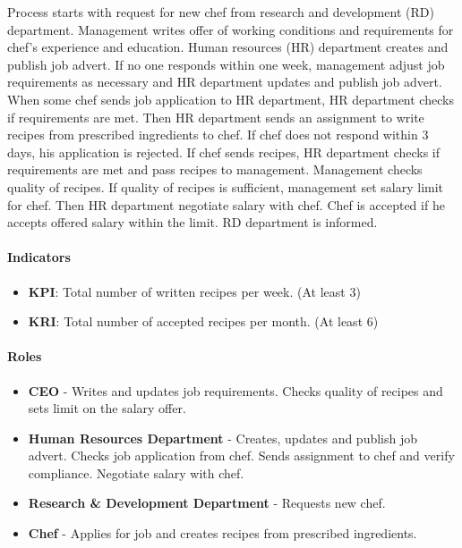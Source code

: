 \documentclass[11pt,a4paper]{article}
\begin{document}
Process starts with request for new chef from research and development (RD) department. Management writes offer of working conditions and requirements for chef's experience and education. Human resources (HR) department creates and publish job advert. If no one responds within one week, management adjust job requirements as necessary and HR department updates and publish job advert. When some chef sends job application to HR department, HR department checks if requirements are met. Then HR department sends an assignment to write recipes from prescribed ingredients to chef. If chef does not respond within 3 days, his application is rejected. If chef sends recipes, HR department checks if requirements are met and pass recipes to management. Management checks quality of recipes. If quality of recipes is sufficient, management set salary limit for chef. Then HR department negotiate salary with chef. Chef is accepted if he accepts offered salary within the limit. RD department is informed.

\paragraph{Indicators}

\begin{itemize}
    \item \textbf{KPI}: Total number of written recipes per week. (At least 3)
    \item \textbf{KRI}: Total number of accepted recipes per month. (At least 6)
\end{itemize}

\paragraph{Roles}

\begin{itemize}
    \item \textbf{CEO} - Writes and updates job requirements. Checks quality of recipes and sets limit on the salary offer.
    \item \textbf{Human Resources Department} - Creates, updates and publish job advert. Checks job application from chef. Sends assignment to chef and verify compliance. Negotiate salary with chef.
    \item \textbf{Research \& Development Department} - Requests new chef.
    \item \textbf{Chef} - Applies for job and creates recipes from prescribed ingredients.
\end{itemize}
\end{document}
